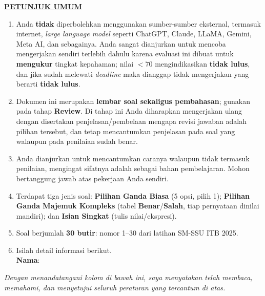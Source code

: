\documentclass[11pt]{article}
\begin{document}
\noindent\textbf{\underline{PETUNJUK UMUM}}
\begin{enumerate}[leftmargin=*,itemsep=4pt,topsep=4pt]
  \item Anda \textbf{tidak} diperbolehkan menggunakan sumber-sumber eksternal,
        termasuk internet, \textit{large language model} seperti ChatGPT, Claude,
        LLaMA, Gemini, Meta AI, dan sebagainya. Anda sangat dianjurkan untuk
        mencoba mengerjakan sendiri terlebih dahulu karena evaluasi ini dibuat
        untuk \textbf{mengukur} tingkat kepahaman; nilai $<70$ mengindikasikan
        \textbf{tidak lulus}, dan jika sudah melewati \textit{deadline} maka
        dianggap tidak mengerjakan yang berarti \textbf{tidak lulus}.

  \item Dokumen ini merupakan \textbf{lembar soal sekaligus pembahasan}; gunakan
        pada tahap \textbf{Review}. Di tahap ini Anda diharapkan mengerjakan ulang
        dengan disertakan penjelasan/pembelaan mengapa revisi jawaban adalah pilihan
        tersebut, dan tetap mencantumkan penjelasan pada soal yang walaupun pada
        penilaian sudah benar.

  \item Anda dianjurkan untuk mencantumkan caranya walaupun tidak termasuk
        penilaian, mengingat sifatnya adalah sebagai bahan pembelajaran.
        Mohon bertanggung jawab atas pekerjaan Anda sendiri.

  \item Terdapat tiga jenis soal: \textbf{Pilihan Ganda Biasa} (5 opsi, pilih 1);
        \textbf{Pilihan Ganda Majemuk Kompleks} (tabel \textbf{Benar}/\textbf{Salah},
        tiap pernyataan dinilai mandiri); dan \textbf{Isian Singkat}
        (tulis nilai/ekspresi).

  \item Soal berjumlah \textbf{30 butir}: nomor 1--30 dari latihan SM-SSU
        ITB 2025.

  \item Isilah detail informasi berikut.\\[0.3em]
        \textbf{Nama}\hspace{0.45cm}:\enspace\underline{\hspace{8cm}}
\end{enumerate}

\vspace{0.6cm}
\noindent\textit{Dengan menandatangani kolom di bawah ini, saya menyatakan telah membaca,
memahami, dan menyetujui seluruh peraturan yang tercantum di atas.}
\end{document}
